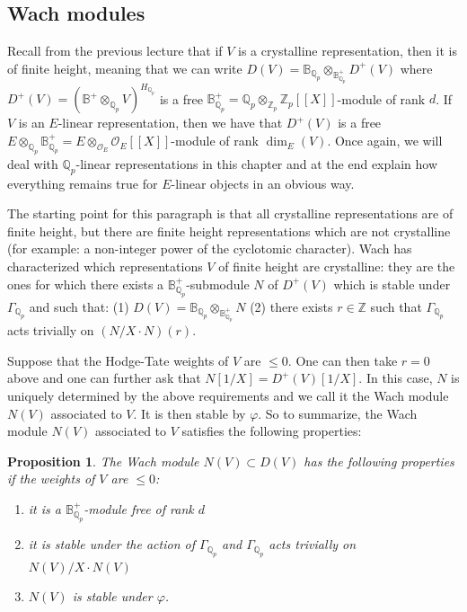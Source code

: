 \documentclass[11pt]{amsart}
\def\Z{{\mathbb Z}_p}
\def\Q{{\mathbb Q}_p}
\def\O{{\mathcal O}_E}
\def\Qp{{\mathbb Q}_p}
\def\bb{\mathbb{B}}
\def\bplus{\mathbb{B}^+}
\newtheorem{prop}[definit]{\bf{Proposition}}
\begin{document}
\subsection{Wach modules}\label{LB51} 
Recall from the previous lecture that if $V$ is a crystalline 
representation, then it is of finite height, meaning that we can write 
$D(V) = \bb_{\Q} \otimes_{\bplus_{\Q}} D^+(V)$ where $D^+(V) = (\bplus 
\otimes_{\Q} V)^{H_{\Q}}$ is a free $\bplus_{\Q} = \Q \otimes_{\Z} 
\Z[[X]]$-module of rank $d$. If $V$ is an $E$-linear representation, 
then we have that $D^+(V)$ is a free $E \otimes_{\Q}  
\bplus_{\Q} = E \otimes_{\O} \O[[X]]$-module of rank 
$\dim_E(V)$. Once again, we will deal with $\Qp$-linear 
representations in this chapter and at the end explain how everything 
remains true for $E$-linear objects in an obvious way.  
 
The starting point for this paragraph is that all crystalline 
representations are of finite height, but there are finite height 
representations which are not crystalline (for example: a non-integer 
power of the cyclotomic character). Wach has characterized which 
representations $V$ of finite height are crystalline: they are the ones 
for which there exists a $\bplus_{\Q}$-submodule $N$ of $D^+(V)$  
which is stable under $\Gamma_{\Q}$ and such 
that: (1) $D(V) = \bb_{\Q} \otimes_{\bplus_{\Q}} N$ (2) there exists 
$r \in \mathbb{Z}$ such that $\Gamma_{\Q}$ acts trivially on $(N/ 
X\cdot N)(r)$. 
 
Suppose that the Hodge-Tate weights of $V$ are $\leq 0$. One can then 
take $r=0$ above and one can further ask that $N[1/X] = 
D^+(V)[1/X]$. In this case, $N$ is uniquely determined by the above 
requirements and we call it the Wach module $N(V)$ associated to 
$V$. It is then stable by $\varphi$. So to summarize, the Wach module 
$N(V)$ associated to $V$ satisfies the following properties: 
 
\begin{prop}\label{wachprp} 
The Wach module $N(V) \subset D(V)$ has the following properties if 
the weights of $V$ are $\leq 0$: 
\begin{enumerate} 
\item it is a $\bplus_{\Q}$-module free of rank $d$  
\item it is stable 
under the action of $\Gamma_{\Q}$ and $\Gamma_{\Q}$ acts trivially on 
$N(V)/X \cdot N(V)$  
\item $N(V)$ is stable under $\varphi$.  
\end{enumerate} 
\end{prop} 
 
\end{document}
